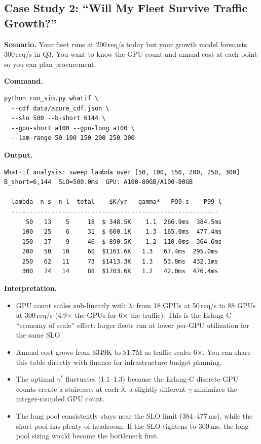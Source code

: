 \documentclass[11pt,a4paper]{article}
\begin{document}
\subsection{Case Study 2: ``Will My Fleet Survive Traffic Growth?''}
\label{sec:cs-whatif}

\textbf{Scenario.}  Your fleet runs at 200\,req/s today but your
growth model forecasts 300\,req/s in Q3.  You want to know the
GPU count and annual cost at each point so you can plan procurement.

\textbf{Command.}
\begin{lstlisting}[style=shell]
python run_sim.py whatif \
  --cdf data/azure_cdf.json \
  --slo 500 --b-short 6144 \
  --gpu-short a100 --gpu-long a100 \
  --lam-range 50 100 150 200 250 300
\end{lstlisting}

\textbf{Output.}
\begin{lstlisting}[style=output]
What-if analysis: sweep lambda over [50, 100, 150, 200, 250, 300]
B_short=6,144  SLO=500.0ms  GPU: A100-80GB/A100-80GB

  lambda  n_s  n_l  total    $K/yr   gamma*   P99_s    P99_l
  ---------------------------------------------------------
      50   13    5     18  $ 348.5K    1.1  266.9ms  384.5ms
     100   25    6     31  $ 600.1K    1.3  165.0ms  477.4ms
     150   37    9     46  $ 890.5K    1.2  110.0ms  364.6ms
     200   50   10     60  $1161.6K   1.3   67.4ms  295.0ms
     250   62   11     73  $1413.3K   1.3   53.8ms  432.1ms
     300   74   14     88  $1703.6K   1.2   42.0ms  476.4ms
\end{lstlisting}

\textbf{Interpretation.}
\begin{itemize}[nosep]
  \item GPU count scales sub-linearly with $\lambda$: from 18 GPUs
    at 50\,req/s to 88 GPUs at 300\,req/s (4.9$\times$ the GPUs
    for 6$\times$ the traffic).  This is the Erlang-C ``economy of
    scale'' effect: larger fleets run at lower per-GPU utilization
    for the same SLO.
  \item Annual cost grows from \$349K to \$1.7M as traffic scales
    6$\times$.  You can share this table directly with finance for
    infrastructure budget planning.
  \item The optimal $\gamma^*$ fluctuates (1.1--1.3) because the
    Erlang-C discrete GPU counts create a staircase: at each $\lambda$,
    a slightly different $\gamma$ minimizes the integer-rounded GPU count.
  \item The long pool consistently stays near the SLO limit (384--477\,ms),
    while the short pool has plenty of headroom.  If the SLO tightens
    to 300\,ms, the long-pool sizing would become the bottleneck first.
\end{itemize}
\end{document}
